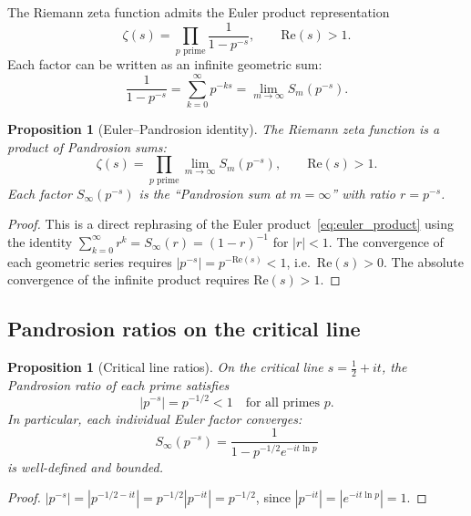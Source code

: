 \documentclass[10pt,a4paper,oneside]{book}
\newtheorem{proposition}[theorem]{Proposition}
\theoremstyle{definition}
\theoremstyle{remark}
\begin{document}
The Riemann zeta function admits the Euler product representation
\begin{equation}
  \label{eq:euler_product}
  \zeta(s) = \prod_{p \text{ prime}} \frac{1}{1 - p^{-s}},
  \qquad \mathrm{Re}(s) > 1.
\end{equation}
Each factor can be written as an infinite geometric sum:
\[
  \frac{1}{1 - p^{-s}} = \sum_{k=0}^{\infty} p^{-ks} = \lim_{m \to \infty} S_m(p^{-s}).
\]

\begin{proposition}[Euler--Pandrosion identity]
\label{prop:euler_pandrosion}
The Riemann zeta function is a product of Pandrosion sums:
\begin{equation}
  \label{eq:euler_pandrosion}
  \zeta(s) = \prod_{p \text{ prime}} \lim_{m \to \infty} S_m(p^{-s}),
  \qquad \mathrm{Re}(s) > 1.
\end{equation}
Each factor $S_\infty(p^{-s})$ is the ``Pandrosion sum at $m = \infty$'' with ratio $r = p^{-s}$.
\end{proposition}

\begin{proof}
This is a direct rephrasing of the Euler product~\eqref{eq:euler_product} using the identity $\sum_{k=0}^{\infty} r^k = S_\infty(r) = (1-r)^{-1}$ for $|r| < 1$.  The convergence of each geometric series requires $|p^{-s}| = p^{-\mathrm{Re}(s)} < 1$, i.e.\ $\mathrm{Re}(s) > 0$.  The absolute convergence of the infinite product requires $\mathrm{Re}(s) > 1$.
\end{proof}

\subsection{Pandrosion ratios on the critical line}

\begin{proposition}[Critical line ratios]
\label{prop:critical_line}
On the critical line $s = \tfrac{1}{2} + it$, the Pandrosion ratio of each prime satisfies
\begin{equation}
  \label{eq:critical_ratio}
  |p^{-s}| = p^{-1/2} < 1 \quad \text{for all primes } p.
\end{equation}
In particular, each individual Euler factor converges:
\[
  S_\infty(p^{-s}) = \frac{1}{1 - p^{-1/2} e^{-it \ln p}}
\]
is well-defined and bounded.
\end{proposition}

\begin{proof}
$|p^{-s}| = |p^{-1/2 - it}| = p^{-1/2} |p^{-it}| = p^{-1/2}$, since $|p^{-it}| = |e^{-it \ln p}| = 1$.
\end{proof}
\end{document}
